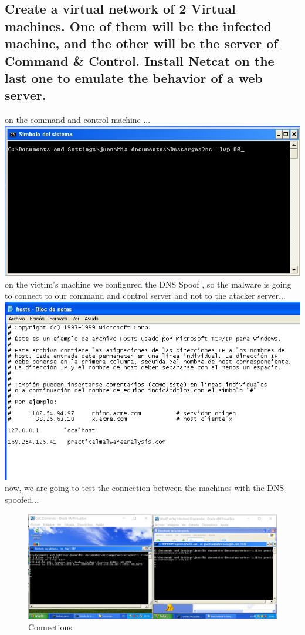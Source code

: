 \documentclass[12pt,letter]{article} %
\begin{document}
        \subsection{ Create a virtual network of 2 Virtual machines. One of
        them will be the infected machine, and the other will be the server of
        Command & Control. Install Netcat on the last one to emulate the behavior
        of a web server.}
        on the command and control machine ...
        \\ \includegraphics[width=0.5\linewidth]{ncliste.jpeg}
        \\
        on the victim's machine we configured the DNS Spoof , so the malware is
        going to connect to our command and control server and not to the atacker server...
        \\ \includegraphics[width=0.5\linewidth]{ncvictim.jpeg}
        \\
        now, we are going to test the connection between the machines with the
        DNS spoofed...
        \\
        \begin{figure}[h!]
            \centering
            \includegraphics[width=0.8\linewidth]{connections.jpeg}
            \caption{Connections}
            \label{fig:connections}
        \end{figure}
\end{document}
